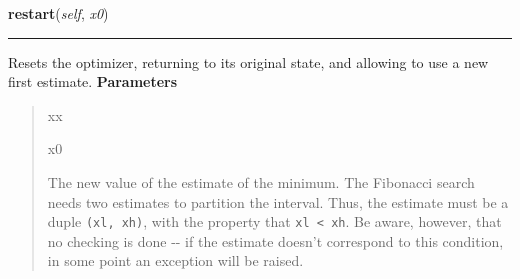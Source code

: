     \label{peach:optm:linear:Fibonacci:restart}

    \vspace{0.5ex}

\hspace{.8\funcindent}\begin{boxedminipage}{\funcwidth}

    \raggedright \textbf{restart}(\textit{self}, \textit{x0})

    \vspace{-1.5ex}

    \rule{\textwidth}{0.5\fboxrule}
\setlength{\parskip}{2ex}

Resets the optimizer, returning to its original state, and allowing to
use a new first estimate.
\setlength{\parskip}{1ex}
      \textbf{Parameters}
      \vspace{-1ex}

      \begin{quote}
        \begin{Ventry}{xx}

          \item[x0]


The new value of the estimate of the minimum. The Fibonacci search
needs two estimates to partition the interval. Thus, the estimate
must be a duple \texttt{(xl, xh)}, with the property that \texttt{xl < xh}. Be
aware, however, that no checking is done -{}- if the estimate doesn't
correspond to this condition, in some point an exception will be
raised.
        \end{Ventry}

      \end{quote}

    \end{boxedminipage}

    \vspace{0.5ex}

